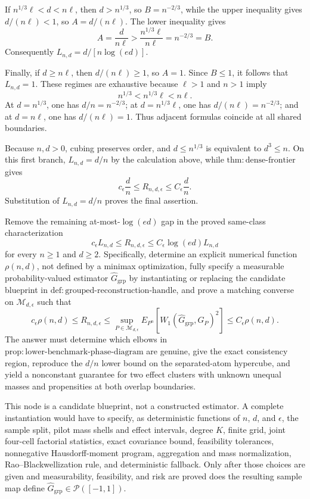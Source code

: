 If \(n^{1/3}\ell<d<n\ell\), then \(d>n^{1/3}\), so \(B=n^{-2/3}\), while the upper inequality gives \(d/(n\ell)<1\), so \(A=d/(n\ell)\).  The lower inequality gives
\[
 A=\frac{d}{n\ell}>\frac{n^{1/3}\ell}{n\ell}=n^{-2/3}=B.
\]
Consequently \(L_{n,d}=d/[n\log(ed)]\).

Finally, if \(d\geq n\ell\), then \(d/(n\ell)\geq1\), so \(A=1\).  Since \(B\leq1\), it follows that \(L_{n,d}=1\).  These regimes are exhaustive because \(\ell>1\) and \(n>1\) imply
\[
 n^{1/3}<n^{1/3}\ell<n\ell.
\]
At \(d=n^{1/3}\), one has \(d/n=n^{-2/3}\); at \(d=n^{1/3}\ell\), one has \(d/(n\ell)=n^{-2/3}\); and at \(d=n\ell\), one has \(d/(n\ell)=1\).  Thus adjacent formulas coincide at all shared boundaries.

Because \(n,d>0\), cubing preserves order, and \(d\leq n^{1/3}\) is equivalent to \(d^3\leq n\).  On this first branch, \(L_{n,d}=d/n\) by the calculation above, while \(\mathrm{thm:dense\mbox{-}frontier}\) gives
\[
 c_\epsilon\frac dn\leq R_{n,d,\epsilon}\leq C_\epsilon\frac dn.
\]
Substitution of \(L_{n,d}=d/n\) proves the final assertion.

Remove the remaining at-most-\(\log(ed)\) gap in the proved same-class characterization
\[
 c_\epsilon L_{n,d}\leq R_{n,d,\epsilon}
 \leq C_\epsilon\log(ed)L_{n,d}
\]
for every \(n\geq1\) and \(d\geq2\).  Specifically, determine an explicit numerical function \(\rho(n,d)\), not defined by a minimax optimization, fully specify a measurable probability-valued estimator \(\widehat G_{\mathrm{grp}}\) by instantiating or replacing the candidate blueprint in \(\mathrm{def:grouped\mbox{-}reconstruction\mbox{-}handle}\), and prove a matching converse on \(\mathcal M_{d,\epsilon}\) such that
\[
 c_\epsilon\rho(n,d)\leq R_{n,d,\epsilon}
 \leq \sup_{P\in\mathcal M_{d,\epsilon}}
 E_{P^n}\!\left[W_1(\widehat G_{\mathrm{grp}},G_P)^2\right]
 \leq C_\epsilon\rho(n,d).
\]
The answer must determine which elbows in \(\mathrm{prop:lower\mbox{-}benchmark\mbox{-}phase\mbox{-}diagram}\) are genuine, give the exact consistency region, reproduce the \(d/n\) lower bound on the separated-atom hypercube, and yield a nonconstant guarantee for two effect clusters with unknown unequal masses and propensities at both overlap boundaries.

This node is a candidate blueprint, not a constructed estimator.  A complete instantiation would have to specify, as deterministic functions of \(n\), \(d\), and \(\epsilon\), the sample split, pilot mass shells and effect intervals, degree \(K\), finite grid, joint four-cell factorial statistics, exact covariance bound, feasibility tolerances, nonnegative Hausdorff-moment program, aggregation and mass normalization, Rao--Blackwellization rule, and deterministic fallback.  Only after those choices are given and measurability, feasibility, and risk are proved does the resulting sample map define \(\widehat G_{\mathrm{grp}}\in\mathcal P([-1,1])\).

